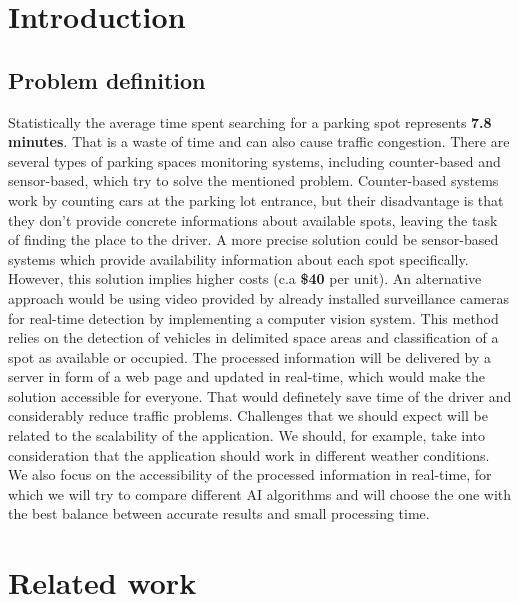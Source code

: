 \documentclass[runningheads,a4paper,11pt]{report}
\begin{document}
\chapter{Introduction}
\label{chapter:introduction}

\section{Problem definition}
\label{section:what}

Statistically the average time spent searching for a parking spot represents \textbf{7.8 minutes}.
That is a waste of time and can also cause traffic congestion. There are several types of 
parking spaces monitoring systems, including counter-based and sensor-based, which try to solve the mentioned problem.
Counter-based systems work by counting cars at the parking lot entrance, but their disadvantage is that they don't provide 
concrete informations about available spots, leaving the task of finding the place to the driver.
A more precise solution could be sensor-based systems which provide availability information about each 
spot specifically. However, this solution implies higher costs (c.a \textbf{\$40} per unit). 
An alternative approach would be using video provided by already installed surveillance cameras for real-time 
detection by implementing a computer vision system.
This method relies on the detection of vehicles in delimited space areas and classification of a spot as 
available or occupied. The processed information will be delivered by a server in form of a web page and updated 
in real-time, which would make the solution accessible for everyone. That would definetely save time of the driver 
and considerably reduce traffic problems.
Challenges that we should expect will be related to the scalability of the application. We should, for example, take into 
consideration that the application should work in different weather conditions. We also focus on the accessibility 
of the processed information in real-time, for which we will try to compare different AI algorithms and will choose 
the one with the best balance between accurate results and small processing time.

\chapter{Related work}
\label{chapter:stateOfArt}
\end{document}
